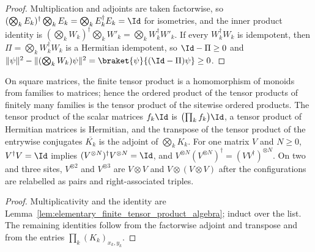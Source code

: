 \begin{proof}
    \leanok
    Multiplication and adjoints are taken factorwise, so
    $(\bigotimes_kE_k)^\dagger\bigotimes_kE_k=\bigotimes_kE_k^\dagger E_k=\Id$
    for isometries, and the inner product identity is
    $(\bigotimes_kW_k)^\dagger\bigotimes_kW'_k=\bigotimes_kW_k^\dagger W'_k$.
    If every $W_k^\dagger W_k$ is idempotent, then
    $\Pi=\bigotimes_kW_k^\dagger W_k$ is a Hermitian idempotent, so
    $\Id-\Pi\geq0$ and
    $\lVert\psi\rVert^2-\lVert(\bigotimes_kW_k)\psi\rVert^2
        =\braket{\psi}{(\Id-\Pi)\psi}\geq0$.
\end{proof}

\begin{lemma}
    \label{lem:elementary_finite_tensor_product_powers}
    \leanok
    On square matrices, the finite tensor product is a homomorphism of monoids
    from families to matrices; hence the ordered product of the tensor products
    of finitely many families is the tensor product of the sitewise ordered
    products. The tensor product of the scalar matrices $f_k\Id$ is
    $\bigl(\prod_kf_k\bigr)\Id$, a tensor product of Hermitian matrices is
    Hermitian, and the transpose of the tensor product of the entrywise
    conjugates $\overline{K_k}$ is the adjoint of $\bigotimes_kK_k$. For one
    matrix $V$ and $N\ge0$, $V^\dagger V=\Id$ implies
    $(V^{\otimes N})^\dagger V^{\otimes N}=\Id$, and
    $V^{\otimes N}(V^{\otimes N})^\dagger=(VV^\dagger)^{\otimes N}$. On two
    and three sites, $V^{\otimes2}$ and $V^{\otimes3}$ are $V\otimes V$ and
    $V\otimes(V\otimes V)$ after the configurations are relabelled as pairs
    and right-associated triples.
\end{lemma}

\begin{proof}
    \leanok
    Multiplicativity and the identity are
    Lemma~\ref{lem:elementary_finite_tensor_product_algebra}; induct over the
    list. The remaining identities follow from the factorwise adjoint and
    transpose and from the entries $\prod_k(K_k)_{x_k,y_k}$.
\end{proof}

